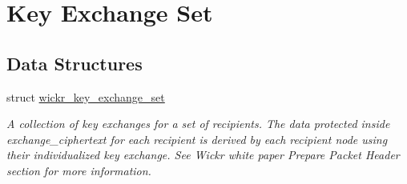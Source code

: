\hypertarget{group__wickr__key__exchange__set}{}\section{Key Exchange Set}
\label{group__wickr__key__exchange__set}
\subsection*{Data Structures}
\begin{DoxyCompactItemize}
\item 
struct \mbox{\hyperlink{structwickr__key__exchange__set}{wickr\+\_\+key\+\_\+exchange\+\_\+set}}
\begin{DoxyCompactList}\small\item\em A collection of key exchanges for a set of recipients. The data protected inside \textquotesingle{}exchange\+\_\+ciphertext\textquotesingle{} for each recipient is derived by each recipient node using their individualized key exchange. See Wickr white paper \textquotesingle{}Prepare Packet Header\textquotesingle{} section for more information. \end{DoxyCompactList}\end{DoxyCompactItemize}
